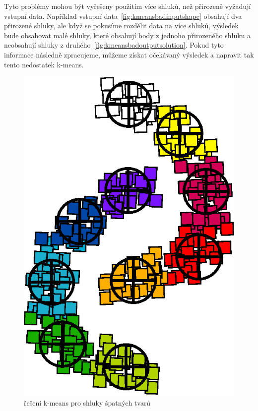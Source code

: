 Tyto problémy mohou být vyřešeny použitím více shluků, než přirozeně vyžadují vstupní data. Například vstupní data~\autoref{fig:kmeansbadinputshape} obsahují dva přirozené shluky, ale když se pokusíme rozdělit data na více shluků, výsledek bude obsahovat malé shluky, které obsahují body z jednoho přirozeného shluku a neobsahují shluky z druhého~\autoref{fig:kmeansbadoutputsolution}. Pokud tyto informace následně zpracujeme, můžeme získat očekávaný výsledek a napravit tak tento nedostatek k-means.
\begin{figure}[h]
  \centering
  \includegraphics[width=.3\textwidth]{img/kmeans_badOutputSampleShapeSolution.eps}
  \caption{řešení k-means pro shluky špatných tvarů}
  \label{fig:kmeansbadoutputsolution}
\end{figure}


